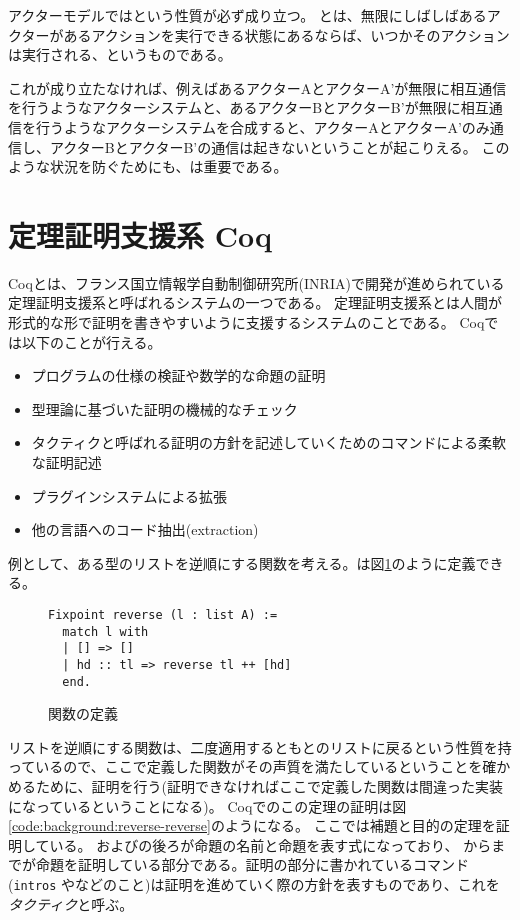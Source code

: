 アクターモデルでは\fairness という性質が必ず成り立つ。
\fairness とは、無限にしばしばあるアクターがあるアクションを実行できる状態にあるならば、いつかそのアクションは実行される、というものである。

これが成り立たなければ、例えばあるアクターAとアクターA'が無限に相互通信を行うようなアクターシステムと、あるアクターBとアクターB'が無限に相互通信を行うようなアクターシステムを合成すると、アクターAとアクターA'のみ通信し、アクターBとアクターB'の通信は起きないということが起こりえる。
このような状況を防ぐためにも、\fairness は重要である。


\section{定理証明支援系 Coq}

Coqとは、フランス国立情報学自動制御研究所(INRIA)で開発が進められている定理証明支援系と呼ばれるシステムの一つである。
定理証明支援系とは人間が形式的な形で証明を書きやすいように支援するシステムのことである。
Coqでは以下のことが行える。

\begin{itemize}
\item プログラムの仕様の検証や数学的な命題の証明
\item 型理論に基づいた証明の機械的なチェック
\item タクティクと呼ばれる証明の方針を記述していくためのコマンドによる柔軟な証明記述
\item プラグインシステムによる拡張
\item 他の言語へのコード抽出(extraction)
\end{itemize}

例として、ある型のリストを逆順にする関数を考える。は図\ref{code:background:reverse}のように定義できる。

\begin{figure}
\begin{lstlisting}
Fixpoint reverse (l : list A) :=
  match l with
  | [] => []
  | hd :: tl => reverse tl ++ [hd]
  end.
\end{lstlisting}
\label{code:background:reverse}
\caption{関数の定義}
\end{figure}

リストを逆順にする関数は、二度適用するともとのリストに戻るという性質を持っているので、ここで定義した関数がその声質を満たしているということを確かめるために、証明を行う(証明できなければここで定義した関数は間違った実装になっているということになる)。
Coqでのこの定理の証明は図\ref{code:background:reverse-reverse}のようになる。
ここでは補題と目的の定理を証明している。
およびの後ろが命題の名前と命題を表す式になっており、
からまでが命題を証明している部分である。証明の部分に書かれているコマンド(\lstinline{intros} やなどのこと)は証明を進めていく際の方針を表すものであり、これを\emph{タクティク}と呼ぶ。

